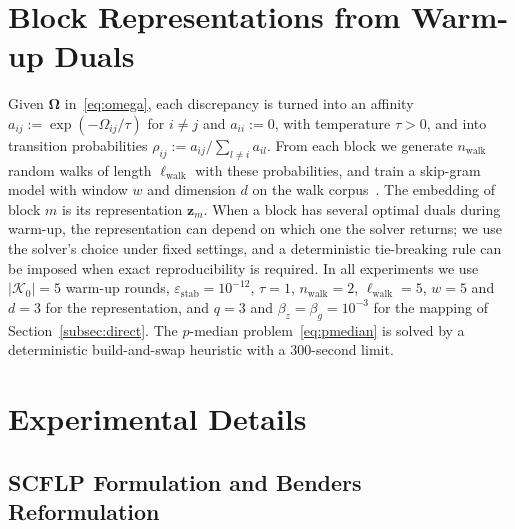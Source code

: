 \section{Block Representations from Warm-up Duals}\label{app:representation}

Given $\boldsymbol\Omega$ in~\eqref{eq:omega}, each discrepancy is turned into an affinity $a_{ij}:=\exp(-\Omega_{ij}/\tau)$ for $i\ne j$ and $a_{ii}:=0$, with temperature $\tau>0$, and into transition probabilities $\rho_{ij}:=a_{ij}/\sum_{l\ne i}a_{il}$. From each block we generate $n_{\mathrm{walk}}$ random walks of length $\ell_{\mathrm{walk}}$ with these probabilities, and train a skip-gram model with window $w$ and dimension $d$ on the walk corpus~\cite{perozzi2014deepwalk,mikolov2013distributed}. The embedding of block $m$ is its representation $\mathbf z_m$. When a block has several optimal duals during warm-up, the representation can depend on which one the solver returns; we use the solver's choice under fixed settings, and a deterministic tie-breaking rule can be imposed when exact reproducibility is required. In all experiments we use $|\mathcal K_0|=5$ warm-up rounds, $\varepsilon_{\mathrm{stab}}=10^{-12}$, $\tau=1$, $n_{\mathrm{walk}}=2$, $\ell_{\mathrm{walk}}=5$, $w=5$ and $d=3$ for the representation, and $q=3$ and $\beta_z=\beta_g=10^{-3}$ for the mapping of Section~\ref{subsec:direct}. The $p$-median problem~\eqref{eq:pmedian} is solved by a deterministic build-and-swap heuristic with a 300-second limit.

\section{Experimental Details}\label{app:experiments}

\subsection{SCFLP Formulation and Benders Reformulation}\label{app:scflp}


